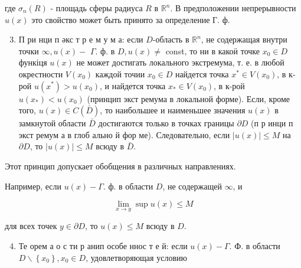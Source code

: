 \documentclass[10pt]{article}
\begin{document}
где $\sigma_{n}(R)$ - площадь сферы радиуса $R$ в $\mathbb{R}^{n}$. В предположении непрерывности $u(x)$ это свойство может быть принято за определение Г. ф.



\begin{enumerate}

  \setcounter{enumi}{2}

  \item П ри нци п әкс т р е м у м а: если $D$-область в $\mathbb{R}^{n}$, не содержащая внутри точки $\infty, u(x)-$ $\Gamma$. ф. в $D, u(x) \neq$ const, то ни в какоӥ точке $x_{0} \in D$ функіця $u(x)$ не может достигать локального экстремума, т. е. в любой окрестности $V\left(x_{0}\right)$ каждой точии $x_{0} \in D$ найдется точка $x^{*} \in V\left(x_{0}\right)$, в к-рой $u\left(x^{*}\right)>u\left(x_{0}\right)$, и найдется точка $x_{*} \in V\left(x_{0}\right)$, в к-рой $u\left(x_{*}\right)<u\left(x_{0}\right)$ (принцип экст ремума в локальной форме). Если, кроме того, $u(x) \in C(\bar{D})$, то наибольшее и наименьшее значения $u(x)$ в замкнутой области $\bar{D}$ достигаются только в точках границы $\partial D$ (п р инци п экст ремум а в глоб ально й фор ме). Следовательно, если $|u(x)| \leqslant M$ на $\partial D$, то $|u(x)| \leqslant M$ всюду в $\bar{D}$.

\end{enumerate}



Этот принцип допускает обобщения в различных направлениях.



Например, если $u(x)-\Gamma$. ф. в области $D$, не содержащей $\infty$, и



\[

\lim _{x \rightarrow y} \sup u(x) \leqslant M

\]



для всех точек $y \in \partial D$, то $u(x) \leqslant M$ всюду в $D$.



\begin{enumerate}

  \setcounter{enumi}{3}

  \item Те орем а о с ти р анип особе ннос т е й: если $u(x)-\Gamma$. Ф. в области $D \backslash\left\{x_{0}\right\}, x_{0} \in D$, удовлетворяющая условию

\end{enumerate}
\end{document}
